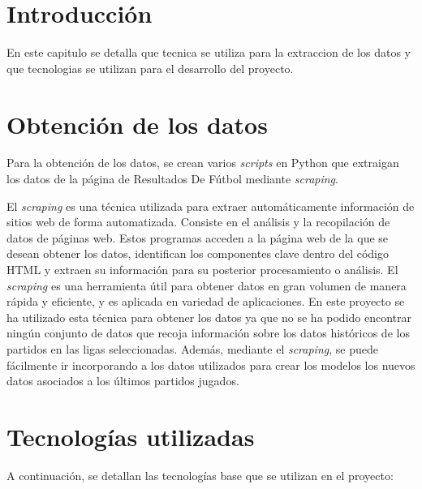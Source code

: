 
\section{Introducción}
En este capitulo se detalla que tecnica se utiliza para la extraccion de los datos y que tecnologias se utilizan para el desarrollo del proyecto. 






\section{Obtención de los datos}
Para la obtención de los datos, se crean varios \textit{scripts} en Python que extraigan los datos de la página de Resultados De Fútbol \cite{resultadosfutbol} mediante \textit{scraping}.

El \textit{scraping} \cite{scraping} es una técnica utilizada para extraer automáticamente información de sitios web de forma automatizada. Consiste en el análisis y la recopilación de datos de páginas web. Estos programas acceden a la página web de la que se desean obtener los datos, identifican los componentes clave dentro del código HTML y extraen su información para su posterior procesamiento o análisis. El \textit{scraping} es una herramienta útil para obtener datos en gran volumen de manera rápida y eficiente, y es aplicada en variedad de aplicaciones. En este proyecto se ha utilizado esta técnica para obtener los datos ya que no se ha podido encontrar ningún conjunto de datos que recoja información sobre los datos históricos de los partidos en las ligas seleccionadas. Además, mediante el \textit{scraping}, se puede fácilmente ir incorporando a los datos utilizados para crear los modelos los nuevos datos asociados a los últimos partidos jugados.





\section{Tecnologías utilizadas}

A continuación, se detallan las tecnologías base que se utilizan en el proyecto:


